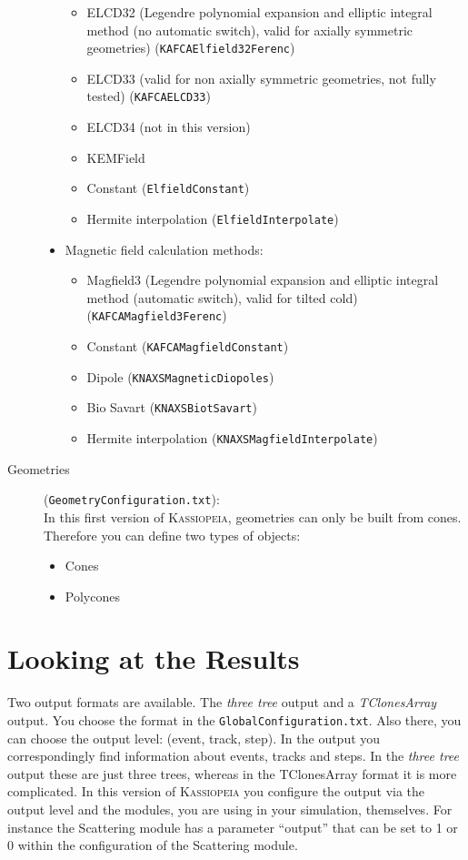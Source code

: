 \begin{description}
\begin{itemize}
\begin{itemize}
			\item ELCD32 (Legendre polynomial expansion and elliptic integral method (no automatic switch), valid for axially symmetric geometries) (\texttt{KAFCAElfield32Ferenc})
			\item ELCD33 (valid for non axially symmetric geometries, not fully tested) (\texttt{KAFCAELCD33})
			\item ELCD34 (not in this version)
			\item KEMField
			\item Constant (\texttt{ElfieldConstant})
			\item Hermite interpolation (\texttt{ElfieldInterpolate})
		\end{itemize}
	\item Magnetic field calculation methods:
		\begin{itemize}
			\item Magfield3 (Legendre polynomial expansion and elliptic integral method (automatic switch), valid for tilted cold) (\texttt{KAFCAMagfield3Ferenc})
			\item Constant (\texttt{KAFCAMagfieldConstant})
			\item Dipole (\texttt{KNAXSMagneticDiopoles})
			\item Bio Savart (\texttt{KNAXSBiotSavart})
			\item Hermite interpolation (\texttt{KNAXSMagfieldInterpolate})
		\end{itemize}    
	\end{itemize}
	\item[Geometries] (\texttt{GeometryConfiguration.txt}):\\
	In this first version of \textsc{Kassiopeia}, geometries can only be built from cones. Therefore you can define two types of objects:
	\begin{itemize}
		\item Cones
		\item Polycones
	\end{itemize}
\end{description}



\section{Looking at the Results}
Two output formats are available. The \textit{three tree} output and a \textit{TClonesArray} output. You choose the format in the \texttt{GlobalConfiguration.txt}. Also there, you can choose the output level: (event, track, step). In the output you correspondingly find information about events, tracks and steps. In the \textit{three tree} output these are just three trees, whereas in the TClonesArray format it is more complicated. In this version of \textsc{Kassiopeia} you configure the output via the output level and the modules, you are using in your simulation, themselves. For instance the Scattering module has a parameter ``output'' that can be set to 1 or 0 within the configuration of the Scattering module.

